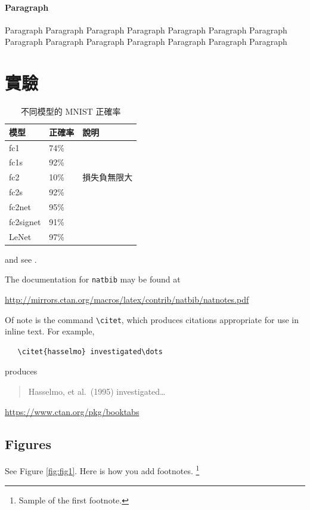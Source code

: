 \documentclass{article}
\begin{document}
\paragraph{Paragraph}

Paragraph Paragraph Paragraph Paragraph Paragraph Paragraph Paragraph Paragraph Paragraph Paragraph Paragraph Paragraph Paragraph Paragraph 

\section{實驗}
\label{sec:others}

\begin{table}
 \caption{不同模型的 MNIST 正確率}
  \centering
  \begin{tabular}{lll}
    模型     & 正確率     & 說明 \\
    \midrule
    fc1 & 74\% &       \\
    fc1s & 92\% &       \\
    fc2 & 10\% & 損失負無限大 \\
    fc2s & 92\% &       \\
    fc2net & 95\% &       \\
    fc2signet & 91\% &       \\
    LeNet & 97\%  &      \\
    \bottomrule
  \end{tabular}
  \label{tab:table}
\end{table}

 \cite{kour2014real,kour2014fast} and see \cite{hadash2018estimate}.

The documentation for \verb+natbib+ may be found at
\begin{center}
  \url{http://mirrors.ctan.org/macros/latex/contrib/natbib/natnotes.pdf}
\end{center}
Of note is the command \verb+\citet+, which produces citations
appropriate for use in inline text.  For example,
\begin{verbatim}
   \citet{hasselmo} investigated\dots
\end{verbatim}
produces
\begin{quote}
  Hasselmo, et al.\ (1995) investigated\dots
\end{quote}

\begin{center}
  \url{https://www.ctan.org/pkg/booktabs}
\end{center}


\subsection{Figures}
\lipsum[10] 
See Figure \ref{fig:fig1}. Here is how you add footnotes. \footnote{Sample of the first footnote.}
\lipsum[11] 
\end{document}
